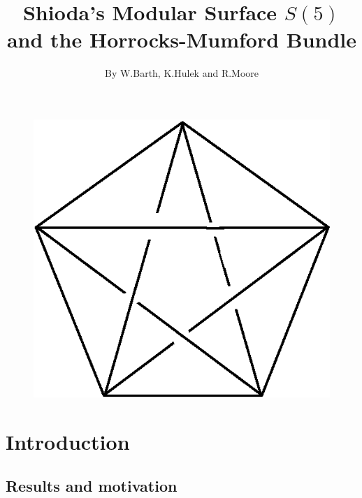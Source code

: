 \title{Shioda's Modular Surface $S(5)$ and the Horrocks-Mumford Bundle}\label{chap2}

\author{By W.\@ Barth, K.\@ Hulek and R.\@ Moore}

\date{}
\maketitle

\setcounter{page}{29}
\begin{figure}[H]
\centering
\includegraphics{figures/chap2-fig1.eps}
\end{figure}


\newpage



\setcounter{pageoriginal}{37}

\section{Introduction}\label{chap2-sec1}\pageoriginale


\subsection{Results and motivation}\label{chap2-sec1.1}


